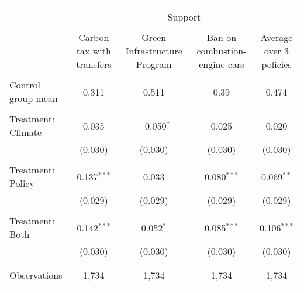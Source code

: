 
\begin{tabular}{@{\extracolsep{5pt}}lcccc} 
\\[-1.8ex]\hline 
\hline \\[-1.8ex] 
 & \multicolumn{4}{c}{Support} \\ 
\cline{2-5} 
\\[-1.8ex] & Carbon tax with transfers & Green Infrastructure Program & Ban on combustion-engine cars & Average over 3 policies \\ 
\hline \\[-1.8ex] 
 Control group mean & 0.311 & 0.511 & 0.39 & 0.474  \\ \hline \\[-1.8ex] Treatment: Climate & 0.035 & $-$0.050$^{*}$ & 0.025 & 0.020 \\ 
  & (0.030) & (0.030) & (0.030) & (0.030) \\ 
  & & & & \\ 
 Treatment: Policy & 0.137$^{***}$ & 0.033 & 0.080$^{***}$ & 0.069$^{**}$ \\ 
  & (0.029) & (0.029) & (0.029) & (0.029) \\ 
  & & & & \\ 
 Treatment: Both & 0.142$^{***}$ & 0.052$^{*}$ & 0.085$^{***}$ & 0.106$^{***}$ \\ 
  & (0.030) & (0.030) & (0.030) & (0.030) \\ 
  & & & & \\ 
\hline \\[-1.8ex] 

Observations & 1,734 & 1,734 & 1,734 & 1,734 \\ 
\hline 
\hline \\[-1.8ex] 
\end{tabular} 